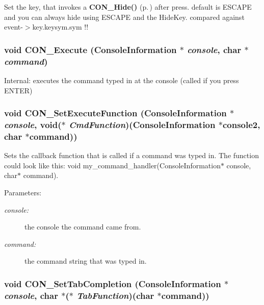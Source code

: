 Set the key, that invokes a {\bf CON\_\-Hide()} {\rm (p.\,\pageref{CON__console_8h_a12})} after press. default is ESCAPE and you can always hide using ESCAPE and the Hide\-Key. compared against event-$>$key.keysym.sym !! 
\subsubsection{\setlength{\rightskip}{0pt plus 5cm}void CON\_\-Execute ({\bf Console\-Information} $\ast$ {\em console}, char $\ast$ {\em command})}\label{CON__console_8h_a27}


Internal: executes the command typed in at the console (called if you press ENTER) 
\subsubsection{\setlength{\rightskip}{0pt plus 5cm}void CON\_\-Set\-Execute\-Function ({\bf Console\-Information} $\ast$ {\em console}, void($\ast$ {\em Cmd\-Function})({\bf Console\-Information} $\ast$console2, char $\ast$command))}\label{CON__console_8h_a28}


Sets the callback function that is called if a command was typed in. The function could look like this: void my\_\-command\_\-handler(Console\-Information$\ast$ console, char$\ast$ command). \begin{Desc}
\item[Parameters: ]\par
\begin{description}
\item[{\em 
console:}]the console the command came from. \item[{\em 
command:}]the command string that was typed in. \end{description}
\end{Desc}
\subsubsection{\setlength{\rightskip}{0pt plus 5cm}void CON\_\-Set\-Tab\-Completion ({\bf Console\-Information} $\ast$ {\em console}, char $\ast$($\ast$ {\em Tab\-Function})(char $\ast$command))}\label{CON__console_8h_a29}


